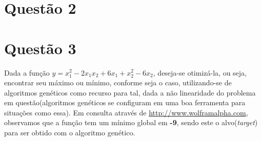 \documentclass[a4paper, 12pt]{article}
\begin{document}
	\section{Questão 2}
	\section{Questão 3}
	Dada a função $y = x_{1}^{2} - 2x_{1}x_{2} + 6x_{1} + x_{2}^2 - 6x_{2}$, deseja-se otimizá-la, ou seja, encontrar seu máximo ou mínimo, conforme seja o caso, utilizando-se de algoritmos genéticos como recurso para tal, dada a não linearidade do problema em questão(algoritmos genéticos se configuram em uma boa ferramenta para situações como essa).  Em consulta através de \url{http://www.wolframalpha.com}, observamos que a função tem um mínimo global em \textbf{-9}, sendo este o alvo(\textit{target}) para ser obtido com o algoritmo genético. 
	
\end{document}
